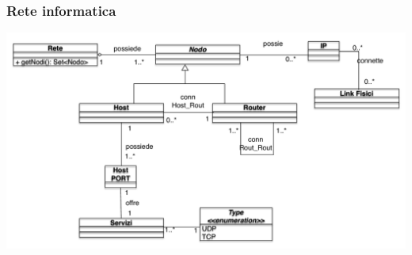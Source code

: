 \documentclass{beamer}
\begin{document}
\begin{frame}
\frametitle{Rete informatica}
\includegraphics[scale=0.4]{Img/inf.pdf}
\end{frame}




\end{document}
